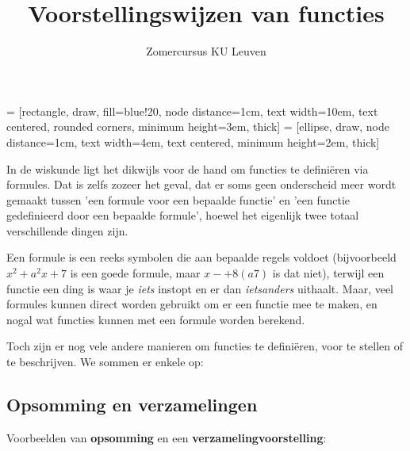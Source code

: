 \documentclass{ximera}
\author{Zomercursus KU Leuven}
\title{Voorstellingswijzen van functies}
\begin{document}
\begin{abstract}

\end{abstract}
\maketitle  

 = [rectangle, draw, fill=blue!20, node distance=1cm, text width=10em, text centered, rounded corners, minimum height=3em, thick]
 = [ellipse, draw, node distance=1cm, text width=4em, text centered, minimum height=2em, thick]


In de wiskunde ligt het dikwijls voor de hand om functies te definiëren via formules. Dat is zelfs zozeer het geval, dat er soms geen onderscheid meer wordt gemaakt tussen 'een formule voor een bepaalde functie' en 'een functie gedefinieerd door een bepaalde formule', hoewel het eigenlijk twee totaal verschillende dingen zijn. 

Een formule is een reeks symbolen die aan bepaalde regels voldoet (bijvoorbeeld $x^2 + a^2x + 7$ is een goede formule, maar $x-+8(a7)$ is dat niet), terwijl een functie een ding is waar je \textit{iets} instopt en er dan \textit{ietsanders} uithaalt. Maar, veel formules kunnen direct worden gebruikt om er een functie mee te maken, en nogal wat functies kunnen met een formule worden berekend. 

Toch zijn er nog vele andere manieren om functies te definiëren, voor te stellen of te beschrijven. We sommen er enkele op:

\subsection{Opsomming en verzamelingen}
Voorbeelden van \textbf{opsomming} en een \textbf{verzamelingvoorstelling}:
\end{document}
